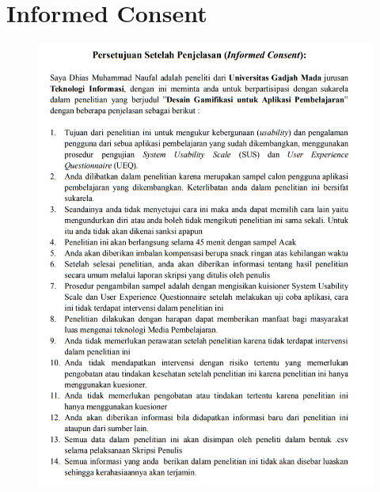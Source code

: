 \section{Informed Consent}
\begin{figure}[H]
	\centering
	\includegraphics[width=\textwidth]{contents/appendix/Inform1.png}
	\label{Fig:Informed Concent}
\end{figure}
\newpage
